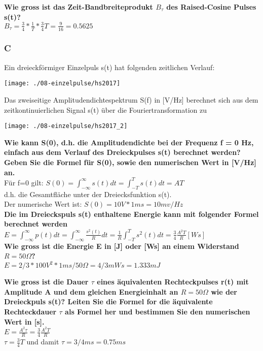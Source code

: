 \textbf{Wie gross ist das Zeit-Bandbreiteprodukt $B_{\tau}$ des Raised-Cosine Pulses s(t)?}\\
$B_{\tau}=\frac{3}{4}*\frac{1}{T}*\frac{3}{4}T=\frac{9}{16}=0.5625$

\subsubsection{C}
Ein dreieckförmiger Einzelpuls s(t) hat folgenden zeitlichen Verlauf:
\begin{center}
    \vspace{-8pt}
    \texttt{[image: ./08-einzelpulse/hs2017]}
    \vspace{-8pt}
\end{center}

Das zweiseitige Amplitudendichtespektrum S(f) in [V/Hz] berechnet sich aus dem zeitkontinuierlichen Signal s(t) über die Fouriertransformation zu\\
\begin{center}
    \vspace{-8pt}
    \texttt{[image: ./08-einzelpulse/hs2017\_2]}
    \vspace{-8pt}
\end{center}

\textbf{Wie kann S(0), d.h. die Amplitudendichte bei der Frequenz f = 0 Hz, \textbf{einfach} aus dem Verlauf des Dreieckpulses s(t) berechnet werden? Geben Sie die Formel für S(0), sowie
den numerischen Wert in [V/Hz] an.}\\
Für f=0 gilt: $S(0)=\int_{-\infty}^{\infty}s(t)dt=\int_{-T}^{T}s(t)dt=AT$\\

d.h. die Gesamtfläche unter der Dreiecksfunktion s(t).\\
Der numerische Wert ist: $S(0)=10V*1ms=10mv/Hz$\\

\textbf{Die im Dreieckspuls s(t) enthaltene Energie kann mit folgender Formel berechnet werden}\\
$E=\int_{-\infty}^{\infty}p(t)dt=\int_{-\infty}^{\infty}\frac{s^2(t)}{R}dt=\frac{1}{R}\int_{-T}^{T}s^2(t)dt=\frac{3}{4}\frac{A^2T}{R}[Ws]$\\

\textbf{Wie gross ist die Energie E in [J] oder [Ws] an einem Widerstand $R = 50 \Omega$?}\\
$E = 2/3 * 100 V^2 * 1ms / 50 \Omega = 4/3 mWs = 1.333 mJ$

\textbf{Wie gross ist die Dauer $\tau$ eines äquivalenten Rechteckpulses r(t) mit Amplitude A und dem gleichen Energieinhalt an $R = 50 \Omega$ wie der Dreieckpuls s(t)? Leiten Sie die Formel for die äquivalente Rechteckdauer $\tau$ als Formel her und bestimmen Sie den numerischen
Wert in [s].}\\
$E=\frac{A^2 \tau }{R}=\frac{3}{4}\frac{A^2T}{R}$\\
$\tau=\frac{3}{4}T$ und damit $\tau=3/4 ms = 0.75ms$\\

